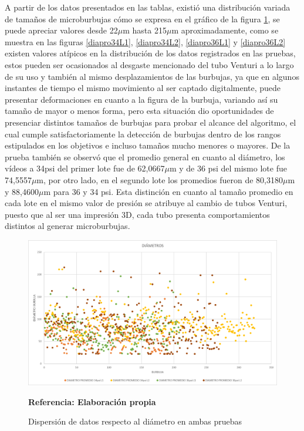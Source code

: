 \documentclass[12pt,twocolumn,a4paper]{article}
\begin{document}
A partir de los datos presentados en las tablas, existió una distribución variada de tamaños de microburbujas cómo se expresa en el gráfico de la figura \ref{dispdia}, se puede apreciar valores desde  22$\mu$m hasta 215$\mu$m aproximadamente, como se muestra en las figuras \ref{diapro34L1}, \ref{diapro34L2}, \ref{diapro36L1} y \ref{diapro36L2} existen valores atípicos en la distribución de los datos registrados en las pruebas, estos pueden ser ocasionados al desgaste mencionado del tubo Venturi a lo largo de su uso y también al mismo desplazamientos de las burbujas, ya que en algunos instantes de tiempo el mismo movimiento al ser captado digitalmente, puede presentar deformaciones en cuanto a la figura de la burbuja, variando así su tamaño de mayor o menos forma, pero esta situación dio oportunidades de presenciar distintos tamaños de burbujas para probar el alcance del algoritmo, el cual cumple satisfactoriamente la detección de burbujas dentro de los rangos estipulados en los objetivos e incluso tamaños mucho menores o mayores. De la prueba también se observó que el promedio general en cuanto al  diámetro, los vídeos a 34psi del primer lote fue de 62,0667$\mu$m y de 36 psi del mismo lote fue 74,5557$\mu$m, por otro lado, en el segundo lote los promedios fueron de 80,3180$\mu$m y 88,4600$\mu$m para 36 y 34 psi. Esta distinción en cuanto al tamaño promedio en cada lote en el mismo valor de presión se atribuye al cambio de tubos Venturi, puesto que al ser una impresión 3D, cada tubo presenta comportamientos distintos al generar microburbujas.

\begin{figure}[h!]
	\centering
	\includegraphics[scale=0.3]{dispDia.png}
	\caption{Dispersión de datos respecto al diámetro en ambas pruebas} \textbf{Referencia: Elaboración propia} 
	\label{dispdia}
\end{figure}
 
\end{document}
